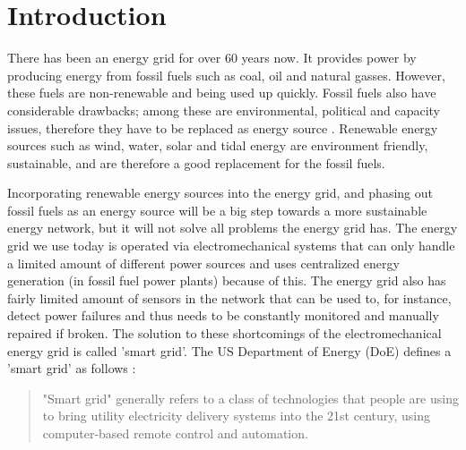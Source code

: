 \section{Introduction}

There has been an energy grid for over 60 years now. It provides power by producing energy from fossil fuels such as coal, oil and natural gasses. However, these fuels are non-renewable and being used up quickly. Fossil fuels also have considerable drawbacks; among these are environmental, political and capacity issues, therefore they have to be replaced as energy source \cite{friedman2008hot}. Renewable energy sources such as wind, water, solar and tidal energy \cite{Tromly2001} are environment friendly, sustainable, and are therefore a good replacement for the fossil fuels.

Incorporating renewable energy sources into the energy grid, and phasing out fossil fuels as an energy source will be a big step towards a more sustainable energy network, but it will not solve all problems the energy grid has. The energy grid we use today is operated via electromechanical systems that can only handle a limited amount of different power sources and uses centralized energy generation (in fossil fuel power plants) because of this. The energy grid also has fairly limited amount of sensors in the network that can be used to, for instance, detect power failures and thus needs to be constantly monitored and manually repaired if broken. The solution to these shortcomings of the electromechanical energy grid is called 'smart grid'. The US Department of Energy (DoE) defines a 'smart grid' as follows \cite{doe}: 
 
\begin{quote}
"Smart grid" generally refers to a class of technologies that people are using to bring utility electricity delivery systems into the 21st century, using computer-based remote control and automation.
\end{quote}

